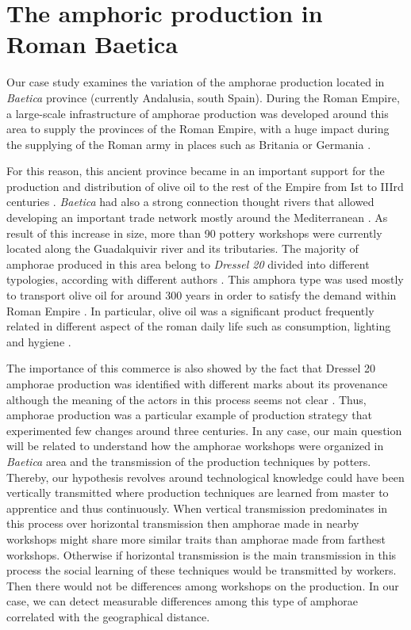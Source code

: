 \documentclass[review]{elsarticle}
\begin{document}
\section{The amphoric production in Roman Baetica}

Our case study examines the variation of the amphorae production located in \emph{Baetica} province (currently Andalusia, south Spain). During the Roman Empire, a large-scale infrastructure of amphorae production was developed around this area to supply the provinces of the Roman Empire, with a huge impact during the supplying of the Roman army in places such as Britania \citep{funari_economic_2005, monfort_britannia_1998} or Germania \citep{remesal_annona_1986}. 

For this reason, this ancient province became in an important support for the production and distribution of olive oil to the rest of the Empire from Ist to IIIrd centuries \cite{chic_comercio_2005,millet_anforas_1998, rodriguez_baetican_1998}. \emph{Baetica} had also a strong connection thought rivers that allowed developing an important trade network mostly around the Mediterranean \citep{garcia_vargas_enrique_formal_2010}. As result of this increase in size, more than 90 pottery workshops were currently located along the Guadalquivir river and its tributaries. The majority of amphorae produced in this area belong to \emph{Dressel 20} divided into different typologies, according with different authors \citep{berni_millet_epigrafianforica_2008, martin-kilcher_romischen_1994}. 
This amphora type was used mostly to transport olive oil for around 300 years in order to satisfy the demand within Roman Empire \citep{rodriguez_economioleicola_1977}. In particular, olive oil was a significant product frequently related in different aspect of the roman daily life such as consumption, lighting and hygiene \citep{mattingly_d.j._oil_1988}. 

The importance of this commerce is also showed by the fact that Dressel 20 amphorae production was identified with different marks about its provenance although the meaning of the actors in this process seems not clear \citep{coto-sarmiento_maria_bayesian_????}. Thus, amphorae production was a particular example of production strategy that experimented few changes around three centuries. In any case, our main question will be related to understand how the amphorae workshops were organized in \textit{Baetica} area and the transmission of the production techniques by potters. Thereby, our hypothesis revolves around technological knowledge could have been vertically transmitted where production techniques are learned from master to apprentice and thus continuously. When vertical transmission predominates in this process over horizontal transmission then amphorae made in nearby workshops might share more similar traits than amphorae made from farthest workshops. Otherwise if horizontal transmission is the main transmission in this process the social learning of these techniques would be transmitted by workers. Then there would not be differences among workshops on the production. In our case, we can detect measurable differences among this type of amphorae correlated with the geographical distance.
\end{document}
